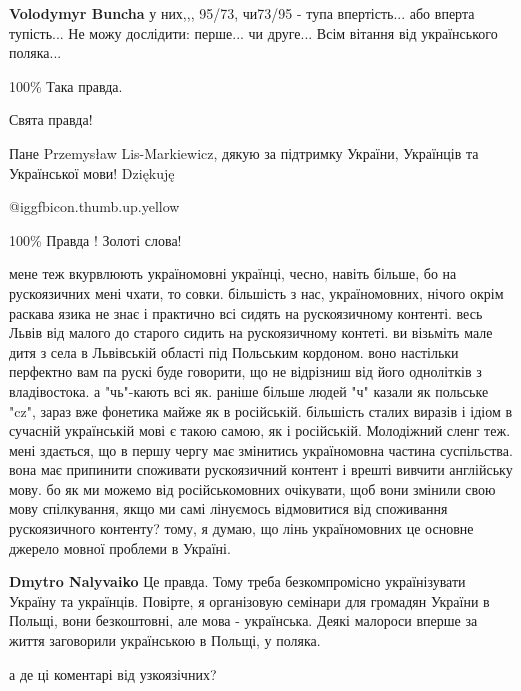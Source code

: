 \begin{itemize}
\begin{itemize} %
\textbf{Volodymyr Buncha} у них,,, 95/73, чи73/95 - тупа впертість... або вперта тупість... Не можу дослідити: перше... чи друге... Всім вітання від українського поляка...
\end{itemize} %

100\% Така правда.

Свята правда!


Пане Przemysław Lis-Markiewicz, дякую за підтримку України, Українців та
Української мови!  Dziękuję

 @igg{fbicon.thumb.up.yellow} 

100\% Правда !
Золоті слова!


мене теж вкурвлюють україномовні українці, чесно, навіть більше, бо на
рускоязичних мені чхати, то совки. більшість з нас, україномовних, нічого окрім
раскава язика не знає і практично всі сидять на рускоязичному контенті. весь
Львів від малого до старого сидить на рускоязичному контеті. ви візьміть мале
дитя з села в Львівській області під Польським кордоном. воно настільки
перфектно вам па рускі буде говорити, що не відрізниш від його однолітків з
владівостока. а "чь"-кають всі як. раніше більше людей "ч" казали як польське
"cz", зараз вже фонетика майже як в російській. більшість сталих виразів і
ідіом в сучасній українській мові є такою самою, як і російській. Молодіжний
сленг теж. мені здається, що в першу чергу має змінитись україномовна частина
суспільства. вона має припинити споживати рускоязичний контент і врешті вивчити
англійську мову. бо як ми можемо від російськомовних очікувати, щоб вони
змінили свою мову спілкування, якщо ми самі лінуємось відмовитися від
споживання рускоязичного контенту? тому, я думаю, що лінь україномовних це
основне джерело мовної проблеми в Україні.

\begin{itemize} %
\textbf{Dmytro Nalyvaiko} Це правда. Тому треба безкомпромісно українізувати Україну та українців. Повірте, я організовую семінари для громадян України в Польщі, вони безкоштовні, але мова - українська. Деякі малороси вперше за життя заговорили українською в Польщі, у поляка.
\end{itemize} %

а де ці коментарі від узкоязічних?


\end{itemize}
